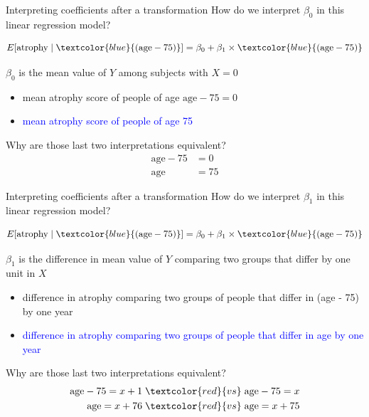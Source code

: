 \documentclass[10pt,t]{beamer}
\begin{document}
\begin{frame}{Interpreting coefficients after a transformation}
How do we interpret $\beta_0$ in this linear regression model?

$$
E[\text{atrophy} \mid \textcolor{blue}{(\text{age} - 75)}] = \beta_0 + \beta_1 \times \textcolor{blue}{(\text{age} - 75)}
$$

\vspace{0.2cm}

$\beta_0$ is the mean value of $Y$ among subjects with $X = 0$
\pause
\begin{itemize}
	\item[] mean atrophy score of people of age $\text{age} - 75 = 0$ \pause
	\item[] \textcolor{blue}{mean atrophy score of people of age 75 } \pause
\end{itemize} 

\vspace{0.3cm}

Why are those last two interpretations equivalent?
\begin{align*}
\text{age} - 75 &= 0 \\
\text{age} & = 75
\end{align*}

\end{frame}

\begin{frame}{Interpreting coefficients after a transformation}
How do we interpret $\beta_1$ in this linear regression model?

$$
E[\text{atrophy} \mid \textcolor{blue}{(\text{age} - 75)}] = \beta_0 + \beta_1 \times \textcolor{blue}{(\text{age} - 75)}
$$

\vspace{0.2cm}

$\beta_1$ is the difference in mean value of $Y$ comparing two groups that differ by one unit in $X$

\begin{itemize}
	\item[] difference in atrophy comparing two groups of people that differ in (age - 75) by one year
	\item[] \textcolor{blue}{difference in atrophy comparing two groups of people that differ in age by one year}
\end{itemize} 

\vspace{0.3cm}

Why are those last two interpretations equivalent?
\begin{align*}
\text{age} - 75 = x + 1 \hspace{0.1cm}& \textcolor{red}{vs}  \hspace{0.1cm}\text{age} - 75 = x \\
\text{age} = x + 76 \hspace{0.1cm}& \textcolor{red}{vs}  \hspace{0.1cm}\text{age}  = x + 75
\end{align*}

\end{frame}
\end{document}
